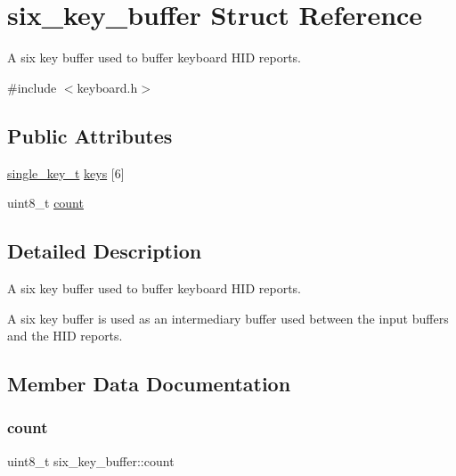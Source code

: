 \hypertarget{structsix__key__buffer}{}\section{six\+\_\+key\+\_\+buffer Struct Reference}
\label{structsix__key__buffer}


A six key buffer used to buffer keyboard H\+ID reports.  




{\ttfamily \#include $<$keyboard.\+h$>$}

\subsection*{Public Attributes}
\begin{DoxyCompactItemize}
\item 
\hyperlink{keyboard_8h_aa504c5d09bf7cea600b72b6003a8772c}{single\+\_\+key\+\_\+t} \hyperlink{structsix__key__buffer_a9377ae2bc38d395132633fb1f4790914}{keys} \mbox{[}6\mbox{]}
\item 
uint8\+\_\+t \hyperlink{structsix__key__buffer_a11703a2763f95be8e14f51bdac78c0eb}{count}
\end{DoxyCompactItemize}


\subsection{Detailed Description}
A six key buffer used to buffer keyboard H\+ID reports. 

A six key buffer is used as an intermediary buffer used between the input buffers and the H\+ID reports. 

\subsection{Member Data Documentation}
\mbox{\label{structsix__key__buffer_a11703a2763f95be8e14f51bdac78c0eb}} 
\subsubsection{\texorpdfstring{count}{count}}
{\footnotesize\ttfamily uint8\+\_\+t six\+\_\+key\+\_\+buffer\+::count}

\mbox{\label{structsix__key__buffer_a9377ae2bc38d395132633fb1f4790914}} 
